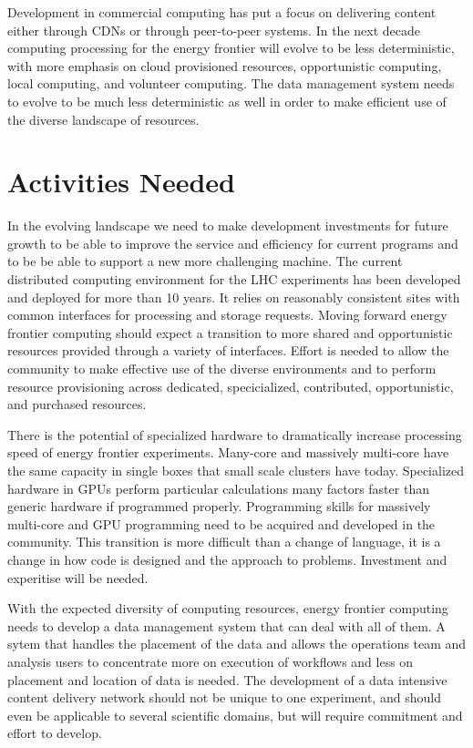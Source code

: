 Development in commercial computing has put a focus on delivering
content either through CDNs or through peer-to-peer systems.  In the
next decade computing processing for the energy frontier will evolve
to be less deterministic, with more emphasis on cloud provisioned
resources, opportunistic computing, local computing, and volunteer
computing.  The data management system needs to evolve to be much less
deterministic as well in order to make efficient use of the diverse
landscape of resources.


\section{Activities Needed}
\label{sec:comp-activities}
In the evolving landscape we need to make development investments for
future growth to be able to improve the service and efficiency for
current programs and to be be able to support a new more challenging
machine.  The current distributed computing environment for the LHC
experiments has been developed and deployed for more than 10 years.
It relies on reasonably consistent sites with common interfaces for
processing and storage requests.  Moving forward energy frontier
computing should expect a transition to more shared and opportunistic
resources provided through a variety of interfaces.  Effort is needed
to allow the community to make effective use of the diverse
environments and to perform resource provisioning across dedicated,
specicialized, contributed, opportunistic, and purchased resources.

There is the potential of specialized hardware to dramatically
increase processing speed of energy frontier experiments.  Many-core
and massively multi-core have the same capacity in single boxes that
small scale clusters have today.  Specialized hardware in GPUs perform
particular calculations many factors faster than generic hardware if
programmed properly.  Programming skills for massively multi-core and
GPU programming need to be acquired and developed in the community.
This transition is more difficult than a change of language, it is a
change in how code is designed and the approach to problems.
Investment and experitise will be needed.

With the expected diversity of computing resources, energy frontier
computing needs to develop a data management system that can deal with
all of them.  A sytem that handles the placement of the data and
allows the operations team and analysis users to concentrate more on
execution of workflows and less on placement and location of data is
needed.  The development of a data intensive content delivery network
should not be unique to one experiment, and should even be applicable
to several scientific domains, but will require commitment and effort
to develop.





